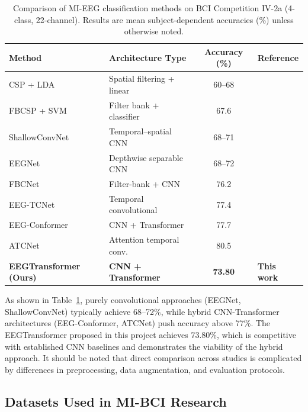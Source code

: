\documentclass[12pt, a4paper]{article}
\begin{document}
\begin{table}[htbp]
\centering
\caption{Comparison of MI-EEG classification methods on BCI Competition IV-2a (4-class, 22-channel). Results are mean subject-dependent accuracies (\%) unless otherwise noted.}
\label{tab:lit_methods}
\begin{tabular}{@{} l l c l @{}}
\toprule
\textbf{Method} & \textbf{Architecture Type} & \textbf{Accuracy (\%)} & \textbf{Reference} \\
\midrule
CSP + LDA           & Spatial filtering + linear      & 60--68   & \cite{hameed2025enhancing} \\
FBCSP + SVM         & Filter bank + classifier        & 67.6     & \cite{ang2008fbcsp} \\
ShallowConvNet      & Temporal--spatial CNN            & 68--71   & \cite{schirrmeister2017deep} \\
EEGNet              & Depthwise separable CNN          & 68--72   & \cite{lawhern2018eegnet} \\
FBCNet              & Filter-bank + CNN               & 76.2     & \cite{mane2021fbcnet} \\
EEG-TCNet           & Temporal convolutional           & 77.4     & \cite{ingolfsson2020eeg} \\
EEG-Conformer       & CNN + Transformer                & 77.7     & \cite{song2022eeg} \\
ATCNet              & Attention temporal conv.         & 80.5     & \cite{altaheri2022atcnet} \\
\midrule
\textbf{EEGTransformer (Ours)} & \textbf{CNN + Transformer} & \textbf{73.80} & \textbf{This work} \\
\bottomrule
\end{tabular}
\end{table}

As shown in Table~\ref{tab:lit_methods}, purely convolutional approaches (EEGNet, ShallowConvNet) typically achieve 68--72\%, while hybrid CNN-Transformer architectures (EEG-Conformer, ATCNet) push accuracy above 77\%. The EEGTransformer proposed in this project achieves 73.80\%, which is competitive with established CNN baselines and demonstrates the viability of the hybrid approach. It should be noted that direct comparison across studies is complicated by differences in preprocessing, data augmentation, and evaluation protocols.

\subsection{Datasets Used in MI-BCI Research}
\end{document}
